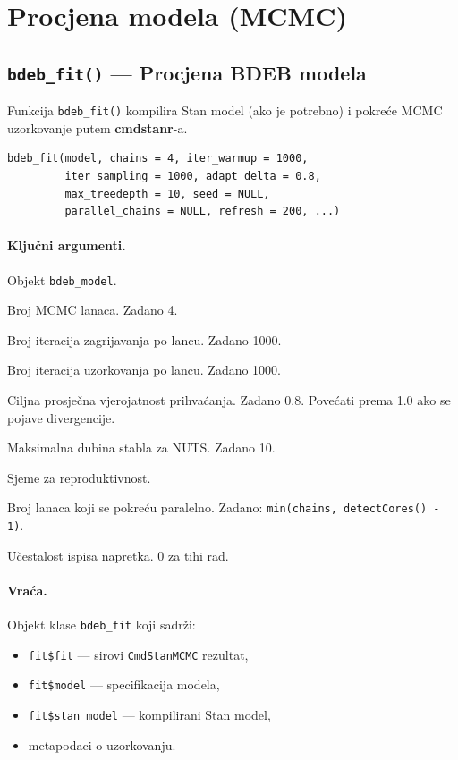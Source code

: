 \documentclass[11pt,a4paper]{article}
\newcommand{\pkg}[1]{\textbf{#1}}
\newcommand{\fn}[1]{\texttt{#1()}}
\newcommand{\code}[1]{\texttt{#1}}
\begin{document}
\section{Procjena modela (MCMC)}
\label{sec:procjena}

\subsection{\fn{bdeb\_fit} --- Procjena BDEB modela}

Funkcija \fn{bdeb\_fit} kompilira Stan model (ako je potrebno) i pokreće
MCMC uzorkovanje putem \pkg{cmdstanr}-a.

\begin{lstlisting}
bdeb_fit(model, chains = 4, iter_warmup = 1000,
         iter_sampling = 1000, adapt_delta = 0.8,
         max_treedepth = 10, seed = NULL,
         parallel_chains = NULL, refresh = 200, ...)
\end{lstlisting}

\paragraph{Ključni argumenti.}
\begin{description}[nosep,leftmargin=3.5cm,style=nextline]
  \item[\code{model}] Objekt \code{bdeb\_model}.
  \item[\code{chains}] Broj MCMC lanaca.  Zadano 4.
  \item[\code{iter\_warmup}] Broj iteracija zagrijavanja po lancu.
    Zadano 1000.
  \item[\code{iter\_sampling}] Broj iteracija uzorkovanja po lancu.
    Zadano 1000.
  \item[\code{adapt\_delta}] Ciljna prosječna vjerojatnost prihvaćanja.
    Zadano 0.8.  Povećati prema 1.0 ako se pojave divergencije.
  \item[\code{max\_treedepth}] Maksimalna dubina stabla za NUTS.
    Zadano 10.
  \item[\code{seed}] Sjeme za reproduktivnost.
  \item[\code{parallel\_chains}] Broj lanaca koji se pokreću paralelno.
    Zadano: \code{min(chains, detectCores() - 1)}.
  \item[\code{refresh}] Učestalost ispisa napretka.  0 za tihi rad.
\end{description}

\paragraph{Vraća.} Objekt klase \code{bdeb\_fit} koji sadrži:
\begin{itemize}[nosep]
  \item \code{fit\$fit} --- sirovi \code{CmdStanMCMC} rezultat,
  \item \code{fit\$model} --- specifikacija modela,
  \item \code{fit\$stan\_model} --- kompilirani Stan model,
  \item metapodaci o uzorkovanju.
\end{itemize}
\end{document}
